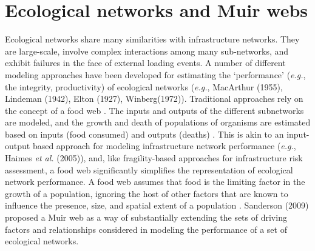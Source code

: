
\section{Ecological networks and Muir webs}
\label{sec:ch4:muirwebs}

Ecological networks share many similarities with infrastructure networks. They are large-scale, involve complex interactions among many sub-networks, and exhibit failures in the face of external loading events. A number of different modeling approaches have been developed for estimating the `performance' (\emph{e.g.}, the integrity, productivity) of ecological networks (\emph{e.g.}, MacArthur (1955)\cite{MacArthur1955}, Lindeman (1942)\cite{Lindeman1942}, Elton (1927)\cite{Elton1927}, Winberg(1972)\cite{Winberg1972}). Traditional approaches rely on the concept of a food web \cite{Paine1980}. The inputs and outputs of the different subnetworks are modeled, and the growth and death of populations of organisms are estimated based on inputs (food consumed) and outputs (deaths) \cite{Pahl-Wostl1993}.  This is akin to an input-output based approach for modeling infrastructure network performance (\emph{e.g.}, Haimes \emph{et al.} (2005)\cite{Haimes2005}), and, like fragility-based approaches for infrastructure risk assessment, a food web significantly simplifies the representation of ecological network performance. A food web assumes that food is the limiting factor in the growth of a population, ignoring the host of other factors that are known to influence the presence, size, and spatial extent of a population \cite{Smith1972}. Sanderson (2009) \cite{Sanderson2009} proposed a Muir web as a way of substantially extending the sets of driving factors and relationships considered in modeling the performance of a set of ecological networks.

